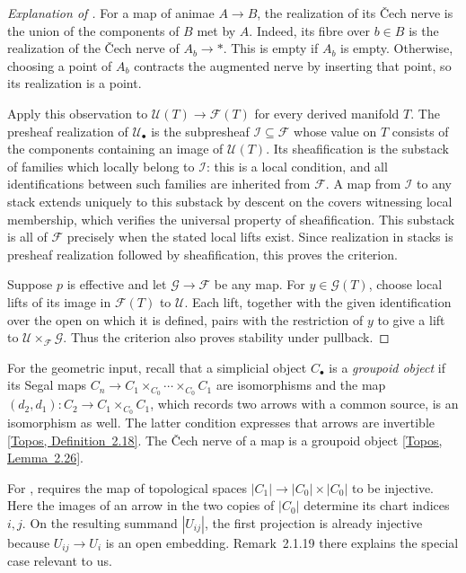 \begin{proof}[Explanation of ]
For a map of animae $A\to B$, the realization of its \v{C}ech nerve
is the union of the components of $B$ met by $A$. Indeed, its fibre
over $b\in B$ is the realization of the \v{C}ech nerve of
$A_b\to *$. This is empty if $A_b$ is empty. Otherwise, choosing a
point of $A_b$ contracts the augmented nerve by inserting that point,
so its realization is a point.

Apply this observation to $\mathcal U(T)\to\mathcal F(T)$ for every derived manifold $T$. The presheaf realization
of $\mathcal U_\bullet$ is the subpresheaf $\mathcal I\subseteq\mathcal F$
whose value on $T$ consists of the components containing an image
of $\mathcal U(T)$. Its sheafification is the substack of families
which locally belong to $\mathcal I$: this is a local condition,
and all identifications between such families are inherited from
$\mathcal F$. A map from $\mathcal I$ to any stack extends uniquely
to this substack by descent on the covers witnessing local membership,
which verifies the universal property of sheafification.
This substack is all of $\mathcal F$ precisely when
the stated local lifts exist. Since realization in stacks is
presheaf realization followed by sheafification, this proves the criterion.

Suppose $p$ is effective and let $\mathcal G\to\mathcal F$ be any map.
For $y\in\mathcal G(T)$, choose local lifts of its image in
$\mathcal F(T)$ to $\mathcal U$. Each lift, together with the given
identification over the open on which it is defined, pairs with the
restriction of $y$ to give a lift to $\mathcal U\times_{\mathcal F}\mathcal G$. Thus the criterion also
proves stability under pullback.
\end{proof}

For the geometric input, recall that a simplicial
object $C_\bullet$ is a \emph{groupoid object} if its Segal maps
$C_n\to C_1\times_{C_0}\cdots\times_{C_0}C_1$ are isomorphisms and the
map $(d_2,d_1)\colon C_2\to C_1\times_{C_0}C_1$, which records two arrows
with a common source, is an isomorphism as well. The latter condition
expresses that arrows are invertible
\href{https://animarium.org/tag/020H/}{[Topos, Definition~2.18]}. The \v{C}ech
nerve of a map is a groupoid object
\href{https://animarium.org/tag/020S/}{[Topos, Lemma~2.26]}.

For ,
\citet[Proposition~2.1.18(2)]{Steffens_Representability_Elliptic_Moduli}
requires the map of topological spaces
$|C_1|\to |C_0|\times |C_0|$ to be injective. Here the images of an
arrow in the two copies of $|C_0|$ determine its chart indices $i,j$.
On the resulting summand $|U_{ij}|$, the first projection is already
injective because $U_{ij}\to U_i$ is an open embedding.
Remark~2.1.19 there explains the special case relevant to us.

